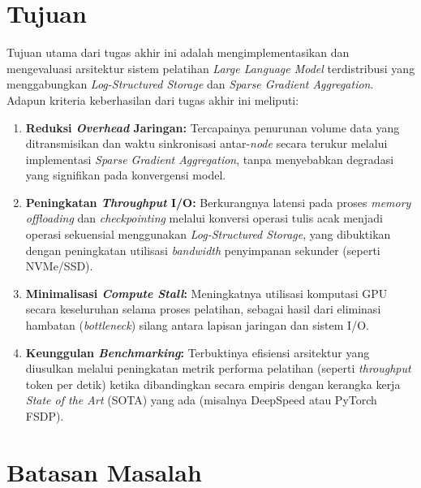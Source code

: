 \section{Tujuan}

Tujuan utama dari tugas akhir ini adalah mengimplementasikan dan mengevaluasi arsitektur sistem pelatihan \emph{Large Language Model} terdistribusi yang menggabungkan \emph{Log-Structured Storage} dan \emph{Sparse Gradient Aggregation}.
Adapun kriteria keberhasilan dari tugas akhir ini meliputi:
\begin{enumerate}
    \item \textbf{Reduksi \emph{Overhead} Jaringan:} Tercapainya penurunan volume data yang ditransmisikan dan waktu sinkronisasi antar-\emph{node} secara terukur melalui implementasi \emph{Sparse Gradient Aggregation}, tanpa menyebabkan degradasi yang signifikan pada konvergensi model.
    \item \textbf{Peningkatan \emph{Throughput} I/O:} Berkurangnya latensi pada proses \emph{memory offloading} dan \emph{checkpointing} melalui konversi operasi tulis acak menjadi operasi sekuensial menggunakan \emph{Log-Structured Storage}, yang dibuktikan dengan peningkatan utilisasi \emph{bandwidth} penyimpanan sekunder (seperti NVMe/SSD).
    \item \textbf{Minimalisasi \emph{Compute Stall}:} Meningkatnya utilisasi komputasi GPU secara keseluruhan selama proses pelatihan, sebagai hasil dari eliminasi hambatan (\emph{bottleneck}) silang antara lapisan jaringan dan sistem I/O.
    \item \textbf{Keunggulan \emph{Benchmarking}:} Terbuktinya efisiensi arsitektur yang diusulkan melalui peningkatan metrik performa pelatihan (seperti \emph{throughput} token per detik) ketika dibandingkan secara empiris dengan kerangka kerja \emph{State of the Art} (SOTA) yang ada (misalnya DeepSpeed atau PyTorch FSDP).
\end{enumerate}

\section{Batasan Masalah}

